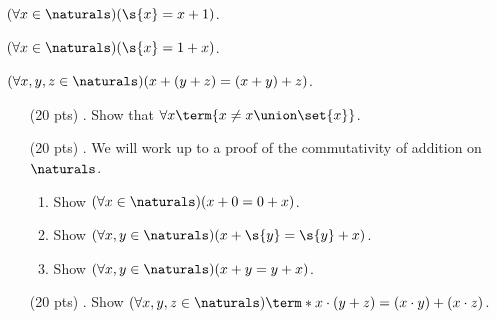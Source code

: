 {  $(\forall x \in \naturals)(\s{x} = x + 1)$.

  $(\forall x \in \naturals)(\s{x} = 1 + x)$.

  $(\forall x, y, z \in \naturals)(x + (y + z) = (x + y) + z)$.
}

\begin{enumerate}

  \item[(20 pts) \quad 1.]
    Show that $\forall x \term{x \neq x \union \set{x}}$.

  \item[(20 pts) \quad 2.]
    We will work up to a proof of the commutativity of addition on $\naturals$.
    \begin{enumerate}
      \item
        Show $(\forall x \in \naturals)(x + 0 = 0 + x)$.
      \item
        Show $(\forall x, y \in \naturals)(x + \s{y} = \s{y} + x)$.
      \item
        Show $(\forall x, y \in \naturals)(x + y = y + x)$.
    \end{enumerate}

  \item[(20 pts) \quad 3.]
    Show $(\forall x, y, z \in \naturals)\term*{x \cdot (y + z) = (x \cdot y) + (x \cdot z)}$.




\end{enumerate}
